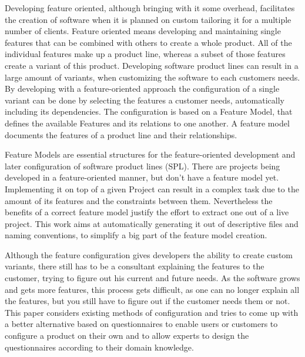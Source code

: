 % 
% 
% 
% 
Developing feature oriented, although bringing with it some overhead, facilitates the creation of software when it is planned on custom tailoring it for a multiple number of clients. Feature oriented means developing and maintaining single features that can be combined with others to create a whole product. All of the individual features make up a product line, whereas a subset of those features create a variant of this product. Developing software product lines can result in a large amount of variants, when customizing the software to each customers needs. By developing with a feature-oriented approach the configuration of a single variant can be done by selecting the features a customer needs, automatically including its dependencies. The configuration is based on a Feature Model, that defines the available Features and its relations to one another. A feature model documents the features of a product line and their relationships\cite{fospl}.

Feature Models are essential structures for the feature-oriented development and later configuration of software product lines (SPL). There are projects being developed in a feature-oriented manner, but don't have a feature model yet. Implementing it on top of a given Project can result in a complex task due to the amount of its features and the constraints between them. Nevertheless the benefits of a correct feature model justify the effort to extract one out of a live project. This work aims at automatically generating it out of descriptive files and naming conventions, to simplify a big part of the feature model creation.

Although the feature configuration gives developers the ability to create custom variants, there still has to be a consultant explaining the features to the customer, trying to figure out his current and future needs. As the software grows and gets more features, this process gets difficult, as one can no longer explain all the features, but you still have to figure out if the customer needs them or not. This paper considers existing methods of configuration and tries to come up with a better alternative based on questionnaires to enable users or customers to configure a product on their own and to allow experts to design the questionnaires according to their domain knowledge.
 
